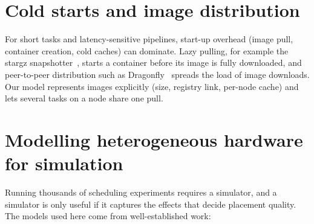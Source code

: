 \documentclass[12pt,a4paper]{report}
\begin{document}
\section{Cold starts and image distribution}

For short tasks and latency-sensitive pipelines, start-up overhead (image
pull, container creation, cold caches) can dominate. Lazy pulling, for
example the stargz snapshotter~\cite{stargz}, starts a container before its
image is fully downloaded, and peer-to-peer distribution such as
Dragonfly~\cite{dragonfly} spreads the load of image downloads. Our model
represents images explicitly (size, registry link, per-node cache) and lets
several tasks on a node share one pull.

\section{Modelling heterogeneous hardware for simulation}

Running thousands of scheduling experiments requires a simulator, and a
simulator is only useful if it captures the effects that decide placement
quality. The models used here come from well-established work:
\end{document}
